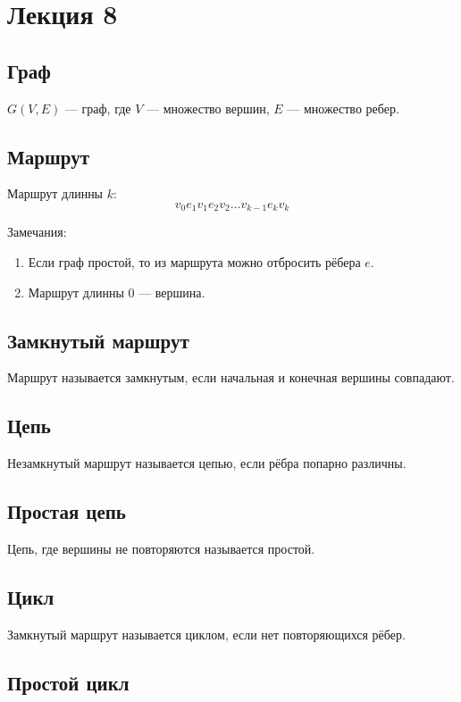 \documentclass[a4paper,12pt]{article} %
\begin{document}
\setcounter{section}{7}
\section{Лекция 8}

\subsection{Граф}

$G(V,E)$ --- граф, где $V$ --- множество вершин, $E$ --- множество ребер.

\subsection{Маршрут}

Маршрут длинны $k$:
$$ v_0 e_1 v_1 e_2 v_2 \dots v_{k-1} e_k v_k $$

Замечания:
\begin{enumerate}
\item Если граф простой, то из маршрута можно отбросить рёбера $e$.
\item Маршрут длинны 0 --- вершина.
\end{enumerate}

\subsection{Замкнутый маршрут}

Маршрут называется замкнутым, если начальная и конечная вершины совпадают.

\subsection{Цепь}
Незамкнутый маршрут называется цепью, если рёбра попарно различны.

\subsection{Простая цепь}
Цепь, где вершины не повторяются называется простой.

\subsection{Цикл}
Замкнутый маршрут называется циклом, если нет повторяющихся рёбер.

\subsection{Простой цикл}
\end{document}
